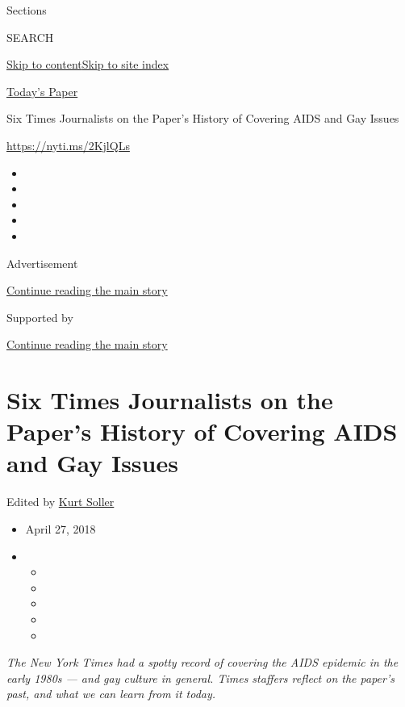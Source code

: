 Sections

SEARCH

\protect\hyperlink{site-content}{Skip to
content}\protect\hyperlink{site-index}{Skip to site index}

\href{https://myaccount.nytimes.com/auth/login?response_type=cookie\&client_id=vi}{}

\href{https://www.nytimes.com/section/todayspaper}{Today's Paper}

Six Times Journalists on the Paper's History of Covering AIDS and Gay
Issues

\href{https://nyti.ms/2KjlQLs}{https://nyti.ms/2KjlQLs}

\begin{itemize}
\item
\item
\item
\item
\item
\end{itemize}

Advertisement

\protect\hyperlink{after-top}{Continue reading the main story}

Supported by

\protect\hyperlink{after-sponsor}{Continue reading the main story}

\hypertarget{six-times-journalists-on-the-papers-history-of-covering-aids-and-gay-issues}{%
\section{Six Times Journalists on the Paper's History of Covering AIDS
and Gay
Issues}\label{six-times-journalists-on-the-papers-history-of-covering-aids-and-gay-issues}}

Edited by \href{https://www.nytimes.com/by/kurt-soller}{Kurt Soller}

\begin{itemize}
\item
  April 27, 2018
\item
  \begin{itemize}
  \item
  \item
  \item
  \item
  \item
  \end{itemize}
\end{itemize}

\emph{The New York Times had a spotty record of covering the AIDS
epidemic in the early 1980s --- and gay culture in general. Times
staffers reflect on the paper's past, and what we can learn from it
today.}

